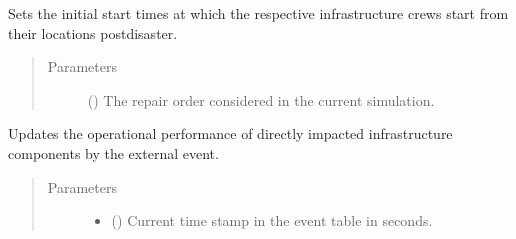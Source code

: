 \documentclass[letterpaper,10pt,english]{sphinxmanual}
\begin{document}
\begin{fulllineitems}
\begin{fulllineitems}
\begin{quote}
\begin{description}
\end{description}\end{quote}

\end{fulllineitems}


\begin{fulllineitems}
\label{\detokenize{apidoc:dreaminsg_integrated_model.src.network_recovery.NetworkRecovery.set_initial_crew_start}}
\sphinxAtStartPar
Sets the initial start times at which the respective infrastructure crews start from their locations post\sphinxhyphen{}disaster.
\begin{quote}\begin{description}
\item[{Parameters}] \leavevmode
\sphinxAtStartPar
{} () \textendash{} The repair order considered in the current simulation.

\end{description}\end{quote}

\end{fulllineitems}


\begin{fulllineitems}
\label{\detokenize{apidoc:dreaminsg_integrated_model.src.network_recovery.NetworkRecovery.update_directly_affected_components}}
\sphinxAtStartPar
Updates the operational performance of directly impacted infrastructure components by the external event.
\begin{quote}\begin{description}
\item[{Parameters}] \leavevmode\begin{itemize}
\item {} 
\sphinxAtStartPar
{} () \textendash{} Current time stamp in the event table in seconds.


\end{itemize}
\end{description}
\end{quote}
\end{fulllineitems}
\end{fulllineitems}
\end{document}
